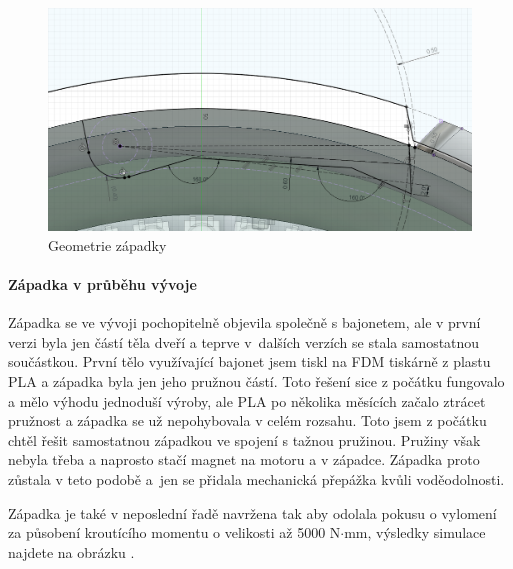 \begin{figure}[htbp]
    \centering
    \includegraphics[width=\textwidth]{kapitoly/obrazky/E4/zapadka/uhel_cela.png}
    \caption{Geometrie západky}
    \label{fig:E4-uhel_cela_zapadky}
\end{figure}

\newpage
\paragraph{Západka v průběhu vývoje}

Západka se ve vývoji pochopitelně objevila společně s bajonetem, ale v první verzi byla jen částí těla dveří a teprve v~dalších verzích se stala
samostatnou součástkou. První tělo využívající bajonet jsem tiskl na FDM tiskárně z plastu PLA a západka byla jen jeho pružnou částí. Toto řešení sice 
z počátku fungovalo a mělo výhodu jednoduší výroby, ale PLA po několika měsících začalo ztrácet pružnost a západka se už nepohybovala v celém rozsahu.
Toto jsem z počátku chtěl řešit samostatnou západkou ve spojení s tažnou pružinou. Pružiny však nebyla třeba a naprosto stačí magnet na motoru a v západce.
Západka proto zůstala v teto podobě a~jen se přidala mechanická přepážka kvůli voděodolnosti. 

Západka je také v neposlední řadě navržena tak aby odolala pokusu o vylomení za působení kroutícího momentu o velikosti až 5000 N$\cdot$mm, výsledky simulace najdete 
na obrázku .

\newpage